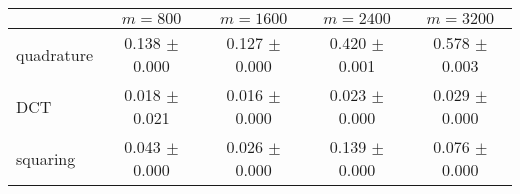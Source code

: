 \centering
\renewcommand{\arraystretch}{1.2}
\begin{tabular}{@{}lcccc@{}}
\toprule
 & $m=800$ & $m=1600$ & $m=2400$ & $m=3200$\\
\midrule
quadrature & 0.138 $\pm$ 0.000 & 0.127 $\pm$ 0.000 & 0.420 $\pm$ 0.001 & 0.578 $\pm$ 0.003 \\
DCT & 0.018 $\pm$ 0.021 & 0.016 $\pm$ 0.000 & 0.023 $\pm$ 0.000 & 0.029 $\pm$ 0.000 \\
squaring & 0.043 $\pm$ 0.000 & 0.026 $\pm$ 0.000 & 0.139 $\pm$ 0.000 & 0.076 $\pm$ 0.000 \\
\bottomrule
\end{tabular}
